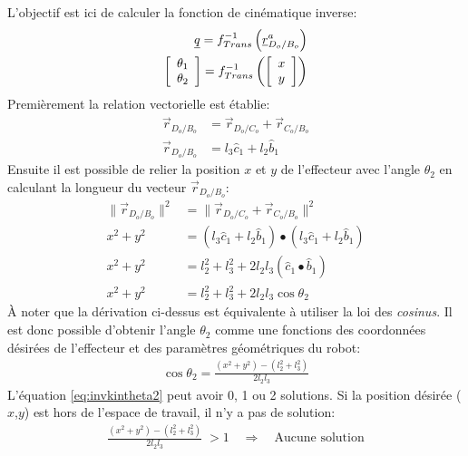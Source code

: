 L'objectif est ici de calculer la fonction de cinématique inverse:
\begin{align}
\underline{q} = f^{-1}_{Trans}\left( \underline{r}^a_{D_o/B_o} \right) \\
\left[ \begin{array}{c}
\theta_1 \\ \theta_2
 \end{array} \right] 
= f^{-1}_{Trans}\left( \left[ \begin{array}{c }
x \\ y
 \end{array} \right]  \right)
\end{align} 
Premièrement la relation vectorielle est établie:
\begin{align}
\vec{r}_{D_o/B_o} &=  \vec{r}_{D_o/C_o} + \vec{r}_{C_o/B_o} \\
\vec{r}_{D_o/B_o} &=  l_3 \hat{c}_1     + l_2 \hat{b}_1
\end{align} 
Ensuite il est possible de relier la position $x$ et $y$ de l'effecteur avec l'angle $\theta_2$ en calculant la longueur du vecteur $\vec{r}_{D_o/B_o}$:
\begin{align}
\| \vec{r}_{D_o/B_o} \|^2  &=  \| \vec{r}_{D_o/C_o} + \vec{r}_{C_o/B_o} \|^2 \\
x^2 + y^2 &=  (l_3 \hat{c}_1 + l_2 \hat{b}_1) \bullet (l_3 \hat{c}_1+ l_2 \hat{b}_1) \\
x^2 + y^2 &=  l_2^2 + l_3^2 + 2 l_2 l_3 ( \hat{c}_1 \bullet \hat{b}_1 ) \\
x^2 + y^2 &=  l_2^2 + l_3^2 + 2 l_2 l_3 \cos \theta_2
\end{align} 
À noter que la dérivation ci-dessus est équivalente à utiliser la loi des \textit{cosinus}. Il est donc possible d'obtenir l'angle $\theta_2$ comme une fonctions des coordonnées désirées de l'effecteur et des paramètres géométriques du robot:
\begin{align}
\cos \theta_2 = \frac{ (x^2 + y^2) - (l_2^2 + l_3^2) }{2 l_2 l_3}
\label{eq:invkintheta2}
\end{align} 
L'équation \eqref{eq:invkintheta2} peut avoir 0, 1 ou 2 solutions. Si la position désirée ($x$,$y$) est hors de l'espace de travail, il n'y a pas de solution:
\begin{align}
\frac{ (x^2 + y^2) - (l_2^2 + l_3^2)}{2 l_2 l_3} \; > 1 \quad\Rightarrow\quad \text{Aucune solution}
\end{align} 
